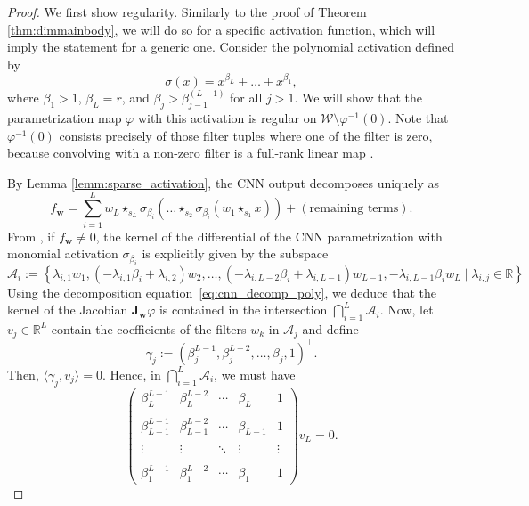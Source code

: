 \documentclass{article} %
\def\eqref#1{equation~\ref{#1}}
\theoremstyle{plain}%
\theoremstyle{definition}
\theoremstyle{remark}
\begin{document}
\begin{proof}
We first show regularity. Similarly to the proof of Theorem \ref{thm:dimmainbody}, we will do so for a specific activation function, which will imply the statement for a generic one. Consider the polynomial activation defined by
\begin{equation}
    \sigma(x) = x^{\beta_L} + \dots + x^{\beta_1},
\end{equation}
where $\beta_1 > 1$, $\beta_L = r$, and $\beta_j > \beta_{j-1}^{(L-1)}$ for all $j > 1$. We will show that the parametrization map $\varphi$ with this activation is regular on $\mathcal{W} \setminus \varphi^{-1}(0)$. 
Note that $\varphi^{-1}(0)$ consists precisely of those filter tuples where one of the filter is zero, because convolving with a non-zero filter is a full-rank linear map \citep[Lemma 4.1]{shahverdi2024geometryoptimizationpolynomialconvolutional}. 

By Lemma \ref{lemm:sparse_activation}, the CNN output decomposes uniquely as
\begin{equation}
\label{eq:cnn_decomp_poly}
f_{\mathbf{w}} = \sum_{i=1}^L w_{L} \star_{s_{L}} \sigma_{\beta_i}\left(\dots \star_{s_2} \sigma_{\beta_i}(w_1 \star_{s_1} x)\right) + (\text{remaining terms}).
\end{equation}
From \citep[Proposition A.2]{shahverdi2024geometryoptimizationpolynomialconvolutional}, if $f_{\mathbf{w}} \neq 0$, the kernel of the differential of the CNN parametrization with monomial activation $\sigma_{\beta_i}$ is explicitly given by the subspace
\begin{equation}
\label{eq:ker_cnn}
    \mathcal{A}_i := \left \{\lambda_{i,1}w_1,(-{\lambda_{i,1}\beta_i+\lambda_{i,2}})w_2,\ldots, (-\lambda_{i,L-2}\beta_i+{\lambda_{i,L-1}})w_{L-1},-\lambda_{i,L-1}\beta_{i}w_L \mid \lambda_{i,j}\in \mathbb{R} \right\}
\end{equation}
Using the decomposition \eqref{eq:cnn_decomp_poly}, we deduce that the kernel of the Jacobian $\mathbf{J}_{\mathbf{w}}\varphi$ is contained in the intersection $\bigcap_{i=1}^{L} \mathcal{A}_i$. 
Now, let $v_j \in \mathbb{R}^L$ contain the coefficients of the filters $w_k$ in $\mathcal{A}_j$ and define 
\begin{equation}
\gamma_j := (\beta_j^{L-1}, \beta_j^{L-2}, \ldots, \beta_j, 1)^\top.
\end{equation}
Then, $\langle \gamma_j,v_j \rangle = 0$. Hence, in $\bigcap_{i=1}^{L} \mathcal{A}_i$, we must have
\begin{equation}
    \label{eq:vandermonde_cnn}
    \begin{pmatrix}
\beta_{L}^{L-1} & \beta_{L}^{L-2} & \cdots & \beta_{L} & 1 \\\\
\beta_{L-1}^{L-1} & \beta_{L-1}^{L-2} & \cdots & \beta_{L-1} & 1 \\\\
\vdots & \vdots & \ddots & \vdots & \vdots \\\\
\beta_{1}^{L-1} & \beta_{1}^{L-2} & \cdots & \beta_{1} & 1
\end{pmatrix}
v_L
= 0.
\end{equation}


\end{proof}
\end{document}
